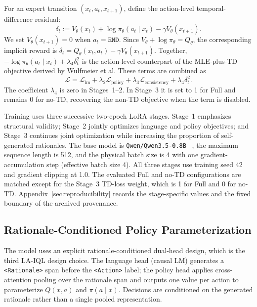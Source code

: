 \documentclass[manuscript,review,anonymous]{acmart}
\begin{document}
For an expert transition $(x_t,a_t,x_{t+1})$, define the action-level temporal-difference residual:
\begin{equation}
\delta_t:=V_\theta(x_t)+\log \pi_\theta(a_t\mid x_t)-\gamma V_\theta(x_{t+1}).
\end{equation}
We set $V_\theta(x_{t+1})=0$ when $a_t=\texttt{END}$. Since $V_\theta+\log\pi_\theta=Q_\theta$, the corresponding implicit reward is $\delta_t=Q_\theta(x_t,a_t)-\gamma V_\theta(x_{t+1})$. Together, $-\log\pi_\theta(a_t\mid x_t)+\lambda_4\delta_t^2$ is the action-level counterpart of the MLE-plus-TD objective derived by Wulfmeier et al.
These terms are combined as
\begin{equation}
\mathcal{L}
=
\mathcal{L}_{\mathrm{lm}}
+
\lambda_2\mathcal{L}_{\mathrm{policy}}
+
\lambda_3\mathcal{L}_{\mathrm{consistency}}
+
\lambda_4\delta_t^2.
\label{eq:total-loss}
\end{equation}
The coefficient $\lambda_4$ is zero in Stages~1--2. In Stage~3 it is set to 1
for Full and remains 0 for no-TD, recovering the non-TD objective when the term
is disabled.

Training uses three successive two-epoch LoRA stages. Stage~1 emphasizes
structural validity; Stage~2 jointly optimizes language and policy objectives;
and Stage~3 continues joint optimization while increasing the proportion of
self-generated rationales. The base model is \texttt{Qwen/Qwen3.5-0.8B}
~\citep{qwen2026qwen35}, the
maximum sequence length is 512, and the physical batch size is 4 with one
gradient-accumulation step (effective batch size 4). All three stages use
training seed 42 and gradient clipping at 1.0. The evaluated Full and no-TD
configurations are matched except for the Stage~3 TD-loss weight, which is 1
for Full and 0 for no-TD. Appendix~\ref{sec:reproducibility} records the
stage-specific values and the fixed boundary of the archived provenance.

\subsection{Rationale-Conditioned Policy Parameterization}

The model uses an explicit rationale-conditioned dual-head design, which is the third LA-IQL design choice.
The language head (causal LM) generates a \texttt{<Rationale>} span before the \texttt{<Action>} label; the policy head applies cross-attention pooling over the rationale span and outputs one value per action to parameterize $Q(x,a)$ and $\pi(a\mid x)$.
Decisions are conditioned on the generated rationale rather than a single pooled representation.
\end{document}

